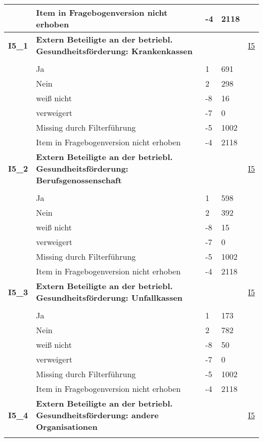 \begin{longtable}{| L{2.5cm} | L{8.25cm}| C{1.5cm} | R{1.25cm} | C{2.25cm} |  }
   & Item in Fragebogenversion nicht erhoben & -4 & 2118 &  \\ 
   \midrule
\textbf{I5\_1}\label{var:suf:I5:1} & \textbf{Extern Beteiligte an der betriebl. Gesundheitsförderung: Krankenkassen} &  &  & \hyperref[I5]{I5} \\ 
   &  &  &  &  \\ 
   & Ja & 1 & 691 &  \\ 
   & Nein & 2 & 298 &  \\ 
   & weiß nicht & -8 & 16 &  \\ 
   & verweigert & -7 & 0 &  \\ 
   & Missing durch Filterführung & -5 & 1002 &  \\ 
   & Item in Fragebogenversion nicht erhoben & -4 & 2118 &  \\ 
   \midrule
\textbf{I5\_2}\label{var:suf:I5:2} & \textbf{Extern Beteiligte an der betriebl. Gesundheitsförderung: Berufsgenossenschaft} &  &  & \hyperref[I5]{I5} \\ 
   &  &  &  &  \\ 
   & Ja & 1 & 598 &  \\ 
   & Nein & 2 & 392 &  \\ 
   & weiß nicht & -8 & 15 &  \\ 
   & verweigert & -7 & 0 &  \\ 
   & Missing durch Filterführung & -5 & 1002 &  \\ 
   & Item in Fragebogenversion nicht erhoben & -4 & 2118 &  \\ 
   \midrule
\textbf{I5\_3}\label{var:suf:I5:3} & \textbf{Extern Beteiligte an der betriebl. Gesundheitsförderung: Unfallkassen} &  &  & \hyperref[I5]{I5} \\ 
   &  &  &  &  \\ 
   & Ja & 1 & 173 &  \\ 
   & Nein & 2 & 782 &  \\ 
   & weiß nicht & -8 & 50 &  \\ 
   & verweigert & -7 & 0 &  \\ 
   & Missing durch Filterführung & -5 & 1002 &  \\ 
   & Item in Fragebogenversion nicht erhoben & -4 & 2118 &  \\ 
   \midrule
\textbf{I5\_4}\label{var:suf:I5:4} & \textbf{Extern Beteiligte an der betriebl. Gesundheitsförderung: andere Organisationen} &  &  & \hyperref[I5]{I5} \\ 
   &  &  &  &  \\ 

\end{longtable}
